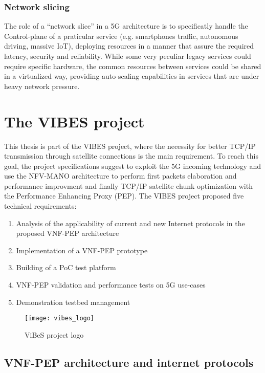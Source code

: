\subsubsection{Network slicing}
The role of a ``network slice'' in a 5G architecture is to specificatly handle 
the Control-plane of a praticular 
service (e.g. smartphones traffic, autonomous driving, massive IoT), deploying 
resources in a manner that assure the required latency, security and 
reliability. While some very peculiar legacy services could require specific 
hardware, the common resources between services could be shared in a 
virtualized way, providing auto-scaling capabilities in services that are under 
heavy network pressure.

\section{The VIBES project}
 
 This thesis is part of the VIBES project, where the necessity for better TCP/IP
 transmission through satellite connections is the main requirement. To reach
 this goal, the project specifications suggest to exploit the 5G incoming
 technology and use the NFV-MANO architecture to perform first packets
 elaboration and performance improvment and finally TCP/IP satellite chunk
 optimization with the Performance Enhancing Proxy (PEP). The VIBES project
 proposed five technical requirements:
\begin{enumerate}
 \item Analysis of the applicability of current and new Internet protocols in
   the proposed VNF-PEP architecture
 \item Implementation of a VNF-PEP prototype
 \item Building of a PoC test platform
 \item VNF-PEP validation and performance tests on 5G use-cases
 \item Demonstration testbed management
\end{enumerate}

\begin{figure}[t]
 \centering
 \texttt{[image: vibes\_logo]}
 \caption{ViBeS project logo}
 \label{chap:background:img:vibes_logo}
\end{figure}


\subsection{VNF-PEP architecture and internet protocols}

